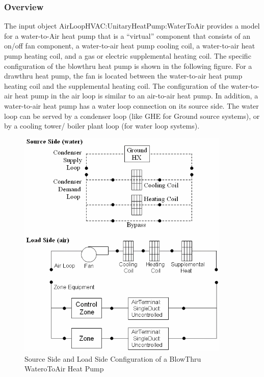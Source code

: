 \subsubsection{Overview}\label{overview-8}

The input object AirLoopHVAC:UnitaryHeatPump:WaterToAir provides a model for a water-to-Air heat pump that is a ``virtual'' component that consists of an on/off fan component, a water-to-air heat pump cooling coil, a water-to-air heat pump heating coil, and a gas or electric supplemental heating coil. The specific configuration of the blowthru heat pump is shown in the following figure. For a drawthru heat pump, the fan is located between the water-to-air heat pump heating coil and the supplemental heating coil. The configuration of the water-to-air heat pump in the air loop is similar to an air-to-air heat pump. In addition, a water-to-air heat pump has a water loop connection on its source side. The water loop can be served by a condenser loop (like GHE for Ground source systems), or by a cooling tower/ boiler plant loop (for water loop systems).

\begin{figure}[hbtp] %
\centering
\includegraphics[width=0.9\textwidth, height=0.9\textheight, keepaspectratio=true]{media/image5222.png}
\caption{  Source Side and Load Side Configuration of a BlowThru WateroToAir Heat Pump \protect \label{fig:source-side-and-load-side-configuration-of-a}}
\end{figure}

